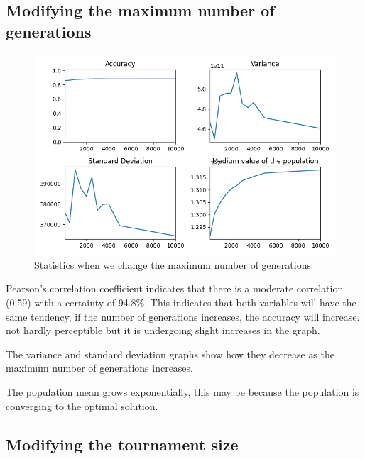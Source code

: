 \documentclass{article}
\begin{document}
    \subsection*{Modifying the maximum number of generations}

    \begin{figure}[H]

        \centering
        \includegraphics[width=1\textwidth]{../media/ej1/02.MaxGenerations_behaviour.png}
        \caption{Statistics when we change the maximum number of generations}
        \label{Statistics when we change the maximum number of generations}

    \end{figure}

    Pearson's correlation coefficient indicates that there is a moderate correlation (0.59) with a certainty of 94.8\%,
    This indicates that both variables will have the same tendency, if the number of generations increases, the accuracy will increase.
    not hardly perceptible but it is undergoing slight increases in the graph.

    The variance and standard deviation graphs show how they decrease as the maximum number of generations increases.

    The population mean grows exponentially, this may be because the population is converging to the optimal solution.

    \subsection*{Modifying the tournament size}
\end{document}
